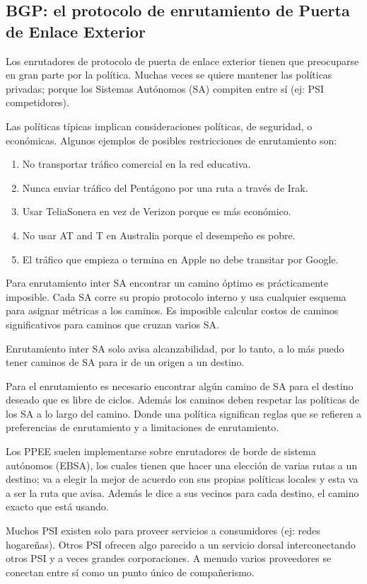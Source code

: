 \documentclass[10pt,a4paper]{report}
\begin{document}
\subsection{BGP: el protocolo de enrutamiento de Puerta de Enlace Exterior}
	\par Los enrutadores de protocolo de puerta de enlace exterior tienen que 
	preocuparse en gran parte por la política. Muchas veces se quiere mantener las 
	políticas privadas; porque los Sistemas Autónomos (SA) compiten entre sí (ej: PSI 
	competidores).	
	\par Las políticas típicas implican consideraciones políticas, de seguridad, o 
	económicas. Algunos ejemplos de posibles restricciones de enrutamiento son:
		\begin{enumerate}
			\item  No transportar tráfico comercial en la red educativa.
			\item Nunca enviar tráfico del Pentágono por una ruta a través de Irak.
			\item Usar TeliaSonera en vez de Verizon porque es más económico.
			\item No usar AT and T en Australia porque el desempeño es pobre.
			\item El tráfico que empieza o termina en Apple no debe transitar por Google.
		\end{enumerate}

	\par Para enrutamiento inter SA encontrar un camino óptimo es prácticamente 
	imposible. Cada SA corre su propio protocolo interno y usa cualquier esquema para 
	asignar métricas a los caminos. Es imposible calcular costos de caminos 
	significativos para caminos que cruzan varios SA.
	\par Enrutamiento inter SA solo avisa alcanzabilidad, por lo tanto, a lo más puedo 
	tener caminos de SA para ir de un origen a un destino.
	
	\par Para el enrutamiento es necesario encontrar algún camino de SA para el destino 
	deseado que es libre de ciclos. Además los caminos deben respetar las políticas de 
	los SA a lo largo del camino. Donde una política significan reglas que se refieren a 
	preferencias de enrutamiento y a limitaciones de enrutamiento.
   \par Los PPEE suelen implementarse sobre enrutadores de borde de sistema 
   autónomos (EBSA), los cuales tienen que hacer una elección de varias rutas a un 
   destino; va a elegir la mejor de acuerdo con sus propias políticas locales y esta va a 
   ser la ruta que avisa. Además le dice a sus vecinos para cada destino, el camino 
   exacto que está usando.
	\par Muchos PSI existen solo para proveer servicios a consumidores (ej: redes 
	hogareñas). Otros PSI ofrecen algo parecido a un servicio dorsal interconectando 
	otros PSI y a veces grandes corporaciones. A menudo varios proveedores se 
	conectan entre sí como un punto único de compañerismo.
\end{document}
